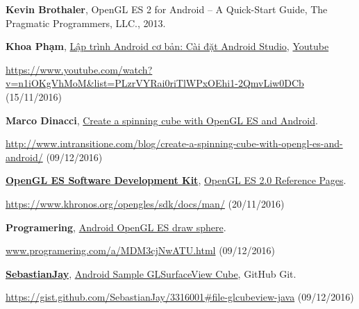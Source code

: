 \documentclass[13pt,a4paper]{extreport}
\begin{document}
\begin{enumerate}[{[1]}]
		\item \textbf{Kevin Brothaler}, OpenGL ES 2 for Android -- A Quick-Start Guide, The Pragmatic Programmers, LLC., 2013.		
		
		\item \textbf{Khoa Phạm}, \href{https://www.youtube.com/watch?v=n1iOKgVhMoM&list=PLzrVYRai0riTlWPxOEhi1-2QmvLiw0DCb}{Lập trình Android cơ bản: Cài đặt Android Studio}, \href{https://www.youtube.com}{Youtube}
		
			\href{https://www.youtube.com/watch?v=n1iOKgVhMoM&list=PLzrVYRai0riTlWPxOEhi1-2QmvLiw0DCb}{https://www.youtube.com/watch?v=n1iOKgVhMoM\&list=PLzrVYRai0riTlWPxOEhi1-2QmvLiw0DCb} (15/11/2016)			

		\item \textbf{Marco Dinacci}, \href{http://www.intransitione.com/blog/create-a-spinning-cube-with-opengl-es-and-android/}{Create a spinning cube with OpenGL ES and Android}.
		
			\href{http://www.intransitione.com/blog/create-a-spinning-cube-with-opengl-es-and-android/}{http://www.intransitione.com/blog/create-a-spinning-cube-with-opengl-es-and-android/} (09/12/2016)
			
		\item \href{https://www.khronos.org/opengles/sdk/}{\textbf{OpenGL ES Software Development Kit}}, \href{https://www.khronos.org/opengles/sdk/docs/man/}{OpenGL ES 2.0 Reference Pages}.
		
			\href{https://www.khronos.org/opengles/sdk/docs/man/}{https://www.khronos.org/opengles/sdk/docs/man/} (20/11/2016)

		\item \textbf{Programering}, \href{www.programering.com/a/MDM3cjNwATU.html}{Android OpenGL ES draw sphere}.
		
			\href{www.programering.com/a/MDM3cjNwATU.html}{www.programering.com/a/MDM3cjNwATU.html} (09/12/2016)

		\item \href{https://gist.github.com/SebastianJay}{\textbf{SebastianJay}}, \href{https://gist.github.com/SebastianJay/3316001#file-glcubeview-java}{Android Sample GLSurfaceView Cube}, GitHub Git.

			\href{https://gist.github.com/SebastianJay/3316001#file-glcubeview-java}{https://gist.github.com/SebastianJay/3316001\#file-glcubeview-java} (09/12/2016)
	\end{enumerate}
\end{document}
